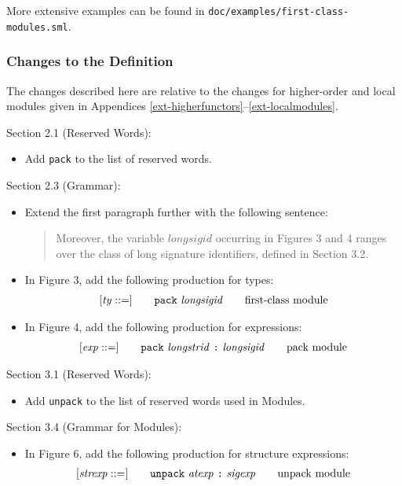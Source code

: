 \documentclass[twoside,titlepage]{article}
\begin{document}
\begin{appendix}
More extensive examples can be found in {\tt doc/examples/first-class-modules.sml}.

\subsubsection*{Changes to the Definition}

The changes described here are relative to the changes for higher-order and local modules given in Appendices \ref{ext-higherfunctors}--\ref{ext-localmodules}.

Section 2.1 (Reserved Words):
\begin{itemize}
\item Add {\tt pack} to the list of reserved words.
\end{itemize}

Section 2.3 (Grammar):
\begin{itemize}
\item Extend the first paragraph further with the following sentence:
  \begin{quote}
  Moreover, the variable $\mathit{longsigid}$ occurring in Figures 3 and 4 ranges over the class of long signature identifiers, defined in Section 3.2.
  \end{quote}

\item In Figure 3, add the following production for types:
  $$
  \begin{array}{l@{\qquad}l@{\qquad}l}
  [\mathit{ty} ::=] & {\tt{pack}}~\mathit{longsigid} & \textrm{first-class module} \\
  \end{array}
  $$

\item In Figure 4, add the following production for expressions:
  $$
  \begin{array}{l@{\qquad}l@{\qquad}l}
  [\mathit{exp} ::=] & {\tt{pack}}~\mathit{longstrid}~\mbox{\tt:}~\mathit{longsigid} & \textrm{pack module} \\
  \end{array}
  $$
\end{itemize}

Section 3.1 (Reserved Words):
\begin{itemize}
\item Add {\tt unpack} to the list of reserved words used in Modules.
\end{itemize}

Section 3.4 (Grammar for Modules):
\begin{itemize}
\item In Figure 6, add the following production for structure expressions:
  $$
  \begin{array}{l@{\qquad}l@{\qquad}l}
  [\mathit{strexp} ::=] & {\tt{unpack}}~\mathit{atexp}~\mbox{\tt:}~\mathit{sigexp} & \textrm{unpack module} \\
  \end{array}
  $$
\end{itemize}


\end{appendix}
\end{document}
